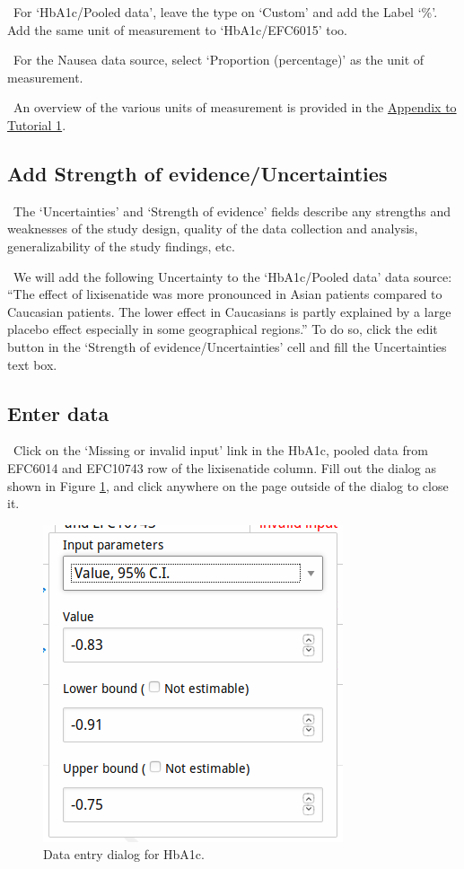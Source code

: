 \documentclass[00_mcda_tutorial.tex]{subfiles}
\begin{document}
\noindent \leftpointright \, For ‘HbA1c/Pooled data’, leave the type on ‘Custom’ and add the Label ‘\%’. Add the same unit of measurement to ‘HbA1c/EFC6015’ too.
\newline

\noindent \leftpointright \, For the Nausea data source, select ‘Proportion (percentage)’ as the unit of measurement.
\newline

\noindent \faGraduationCap \, An overview of the various units of measurement is provided in the \hyperref[appendix1]{Appendix to Tutorial 1}.

\subsection*{Add Strength of evidence/Uncertainties}
\noindent \faGraduationCap \, The ‘Uncertainties’ and ‘Strength of evidence’ fields describe any strengths and weaknesses of the study design, quality of the data collection and analysis, generalizability of the study findings, etc.
\newline

\noindent \leftpointright \, We will add the following Uncertainty to the ‘HbA1c/Pooled data’ data source: “The effect of lixisenatide was more pronounced in Asian patients compared to Caucasian patients. The lower effect in Caucasians is partly explained by a large placebo effect especially in some geographical regions.” To do so, click the edit button in the ‘Strength of evidence/Uncertainties’ cell and fill the Uncertainties text box.

\subsection*{Enter data}
\noindent \leftpointright \, Click on the ‘Missing or invalid input’ link in the HbA1c, pooled data from EFC6014 and EFC10743 row of the lixisenatide column. Fill out the dialog as shown in Figure \ref{fig:data1}, and click anywhere on the page outside of the dialog to close it.

\begin{figure}[!h]
    \centering
	\includegraphics[width=.5\textwidth]{fig/effectsInput.png}
    \caption{Data entry dialog for HbA1c.}
	\label{fig:data1}
\end{figure}
\end{document}
